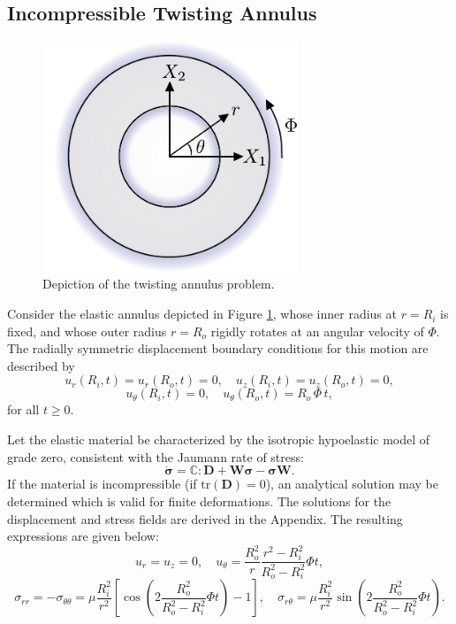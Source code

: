 \subsection*{Incompressible Twisting Annulus}

\begin{figure}[!h]
  \centering
  \includegraphics[width=3.0in]{figures/twisting_annulus_problem.pdf}  		\caption{Depiction of the twisting annulus problem.}
  \label{fig:twisting_annulus_problem}
\end{figure}
Consider the elastic annulus depicted in Figure \ref{fig:twisting_annulus_problem}, whose inner radius at $r = R_i$ is fixed, and whose outer radius $r = R_o$ rigidly rotates at an angular velocity of $\Phi$. The radially symmetric displacement boundary conditions for this motion are described by
\begin{equation}
	u_r (R_i,t) = u_r (R_o,t) = 0, \quad u_z (R_i,t) = u_z (R_o,t) = 0,
\end{equation}
\begin{equation}
	u_\theta (R_i,t) = 0, \quad u_\theta (R_o,t) = R_o \, \Phi \, t,
\end{equation}
for all $t \geq 0$.

Let the elastic material be characterized by the isotropic hypoelastic model of grade zero, consistent with the Jaumann rate of stress:
\begin{equation}
  \dot{\boldsymbol{\sigma}} = \mathbb{C} : \mathbf{D} + \mathbf{W} \boldsymbol{\sigma} - \boldsymbol{\sigma} \mathbf{W}.
\end{equation}
If the material is incompressible (if $\text{tr} (\mathbf{D}) = 0$), an analytical solution may be determined which is valid for finite deformations. The solutions for the displacement and stress fields are derived in the Appendix. The resulting expressions are given below:
\begin{equation}
  u_r = u_z = 0, \quad u_\theta = \frac{R_o^2}{r} \frac{r^2 - R_i^2}{R_o^{2} - R_i^{2}} \Phi t,
  	\label{eq:annulus_u_exact}
\end{equation}
\begin{equation}
  \sigma_{rr} = - \sigma_{\theta \theta} = \mu \frac{R_i^{2}}{r^{2}} \left[ \cos \left( 2 \frac{R_o^{2}}{R_o^{2} - R_i^{2}} \Phi t \right) - 1 \right], \quad \sigma_{r \theta} = \mu \frac{R_i^{2}}{r^{2}} \sin \left( 2 \frac{R_o^{2}}{R_o^{2} - R_i^{2}} \Phi t \right).
  	\label{eq:annulus_s_exact}
\end{equation}

